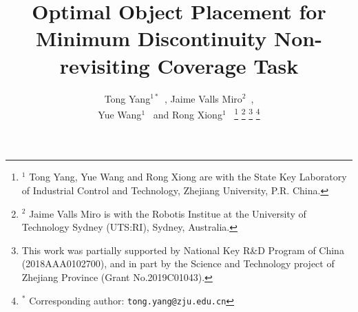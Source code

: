 \documentclass[letterpaper,journal]{IEEEtran}
\begin{document}
%
\title{Optimal Object Placement for Minimum Discontinuity Non-revisiting Coverage Task}
%
%
%


\author{Tong Yang$^{1*}$~, Jaime Valls Miro$^2$~, \\Yue Wang$^{1}$~ and Rong Xiong$^1$~
\thanks{$^1$ Tong Yang, Yue Wang and Rong Xiong are with the State Key 
Laboratory of Industrial Control and Technology, Zhejiang University, P.R. China. 
}
\thanks{$^2$ Jaime Valls Miro is with the Robotis Institue at the University of Technology Sydney (UTS:RI), Sydney, Australia.}
\thanks{This work was partially supported by National Key R\&D Program of China (2018AAA0102700), and in part by the Science and Technology project of Zhejiang Province (Grant No.2019C01043).}
\thanks{$^*$ Corresponding author: {\tt\small tong.yang@zju.edu.cn}}
}
\end{document}
